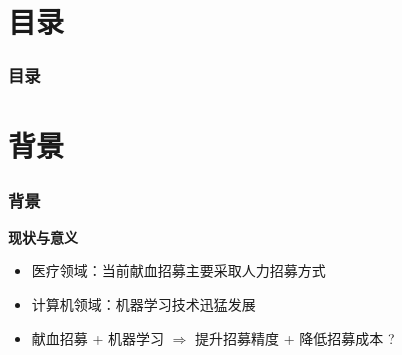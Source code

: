 \documentclass[10pt,aspectratio=43,mathserif]{beamer}
\title[RF-based Blood Donor Recruitment]{\fontsize{13pt}{18pt}\selectfont {基于随机森林的献血招募模型}}
\author[Zixing Song]{
  答辩人：宋子星 \\
  指导教师：薛晖 \\
  }
\institute[SEU]{
  东南大学计算机科学与工程学院\\
  }
\date[\today]{
 \today}
\begin{document}
\begin{frame}
\titlepage
\end{frame}				%



\section*{目录}

		\begin{frame}
		\frametitle{\textbf{目录}}
		\textbf{\tableofcontents}
		\end{frame}				%

\section{背景}

		\begin{frame}
            \frametitle{\textbf{背景}}

            \begin{block}{\textbf{现状与意义}}
                \begin{itemize}
                    \item 医疗领域：当前献血招募主要采取人力招募方式
                    \item 计算机领域：机器学习技术迅猛发展
                    \item 献血招募 + 机器学习 $\Rightarrow$ 提升招募精度 + 降低招募成本 ?
                \end{itemize}
            \end{block}

            \begin{figure}[!t]
                \centering 
            \end{figure}

    \end{frame}
\end{document}
